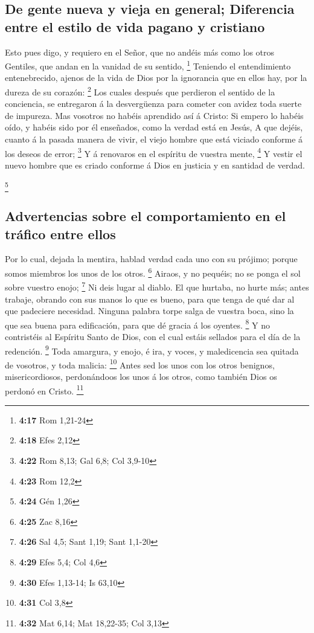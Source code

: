 \hypertarget{de-gente-nueva-y-vieja-en-general-diferencia-entre-el-estilo-de-vida-pagano-y-cristiano}{%
\subsection{De gente nueva y vieja en general; Diferencia entre el
estilo de vida pagano y
cristiano}\label{de-gente-nueva-y-vieja-en-general-diferencia-entre-el-estilo-de-vida-pagano-y-cristiano}}

 Esto pues digo, y requiero en el Señor, que no andéis
más como los otros Gentiles, que andan en la vanidad de su sentido,
\footnote{\textbf{4:17} Rom 1,21-24}  Teniendo el
entendimiento entenebrecido, ajenos de la vida de Dios por la ignorancia
que en ellos hay, por la dureza de su corazón: \footnote{\textbf{4:18}
  Efes 2,12}  Los cuales después que perdieron el sentido
de la conciencia, se entregaron á la desvergüenza para cometer con
avidez toda suerte de impureza.  Mas vosotros no habéis
aprendido así á Cristo:  Si empero lo habéis oído, y
habéis sido por él enseñados, como la verdad está en Jesús,
 A que dejéis, cuanto á la pasada manera de vivir, el
viejo hombre que está viciado conforme á los deseos de error;
\footnote{\textbf{4:22} Rom 8,13; Gal 6,8; Col 3,9-10}  Y
á renovaros en el espíritu de vuestra mente, \footnote{\textbf{4:23} Rom
  12,2}  Y vestir el nuevo hombre que es criado conforme
á Dios en justicia y en santidad de verdad.

\footnote{\textbf{4:24} Gén 1,26}

\hypertarget{advertencias-sobre-el-comportamiento-en-el-truxe1fico-entre-ellos}{%
\subsection{Advertencias sobre el comportamiento en el tráfico entre
ellos}\label{advertencias-sobre-el-comportamiento-en-el-truxe1fico-entre-ellos}}

 Por lo cual, dejada la mentira, hablad verdad cada uno
con su prójimo; porque somos miembros los unos de los otros. \footnote{\textbf{4:25}
  Zac 8,16}  Airaos, y no pequéis; no se ponga el sol
sobre vuestro enojo; \footnote{\textbf{4:26} Sal 4,5; Sant 1,19; Sant
  1,1-20}  Ni deis lugar al diablo.  El
que hurtaba, no hurte más; antes trabaje, obrando con sus manos lo que
es bueno, para que tenga de qué dar al que padeciere necesidad.
 Ninguna palabra torpe salga de vuestra boca, sino la que
sea buena para edificación, para que dé gracia á los oyentes.
\footnote{\textbf{4:29} Efes 5,4; Col 4,6}  Y no
contristéis al Espíritu Santo de Dios, con el cual estáis sellados para
el día de la redención. \footnote{\textbf{4:30} Efes 1,13-14; Is 63,10}
 Toda amargura, y enojo, é ira, y voces, y maledicencia
sea quitada de vosotros, y toda malicia: \footnote{\textbf{4:31} Col 3,8}
 Antes sed los unos con los otros benignos,
misericordiosos, perdonándoos los unos á los otros, como también Dios os
perdonó en Cristo. \footnote{\textbf{4:32} Mat 6,14; Mat 18,22-35; Col
  3,13}

